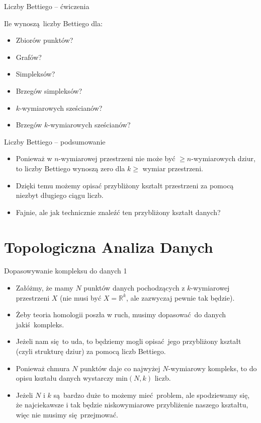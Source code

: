 \documentclass{beamer}
\begin{document}
\begin{frame}{Liczby Bettiego -- ćwiczenia}

Ile wynoszą liczby Bettiego dla:

\begin{itemize}
	\item Zbiorów punktów?
	\item Grafów?
	\item Simpleksów?
	\item Brzegów simpleksów?
	\item $k$-wymiarowych sześcianów?
	\item Brzegów $k$-wymiarowych sześcianów?
\end{itemize}

\end{frame}

\begin{frame}{Liczby Bettiego -- podsumowanie}
\begin{itemize}
	\item Ponieważ w $n$-wymiarowej przestrzeni nie może być $\geq n$-wymiarowych dziur, to liczby Bettiego wynoszą zero dla $k \geq$ wymiar przestrzeni.
	\item Dzięki temu możemy opisać przybliżony kształt przestrzeni za pomocą niezbyt długiego ciągu liczb.
	\item Fajnie, ale jak technicznie znaleźć ten przybliżony kształt danych?
\end{itemize}
\end{frame}

\section{Topologiczna Analiza Danych}

\begin{frame}{Dopasowywanie kompleksu do danych 1}
\begin{itemize}
	\item Załóżmy, że mamy $N$ punktów danych pochodzących z $k$-wymiarowej przestrzeni $X$ (nie musi być $X = \mathbb{R}^k$, ale zazwyczaj pewnie tak będzie).
	\item Żeby teoria homologii poszła w ruch, musimy dopasować do danych jakiś kompleks.
	\item Jeżeli nam się to uda, to będziemy mogli opisać jego przybliżony kształt (czyli strukturę dziur) za pomocą liczb Bettiego.
	\item Ponieważ chmura $N$ punktów daje co najwyżej $N$-wymiarowy kompleks, to do opisu kształu danych wystarczy $\text{min}(N, k)$ liczb.
	\item Jeżeli $N$ i $k$ są bardzo duże to możemy mieć problem, ale spodziewamy się, że najciekawsze i tak będzie niskowymiarowe przybliżenie naszego kształtu, więc nie musimy się przejmować.
\end{itemize}
\end{frame}
\end{document}
